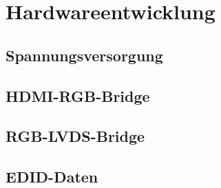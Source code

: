 \section{Hardwareentwicklung}
\label{sec:TeilB_Hardware}

\subsection{Spannungsversorgung}
\subsection{HDMI-RGB-Bridge}
\subsection{RGB-LVDS-Bridge}
\subsection{EDID-Daten}

